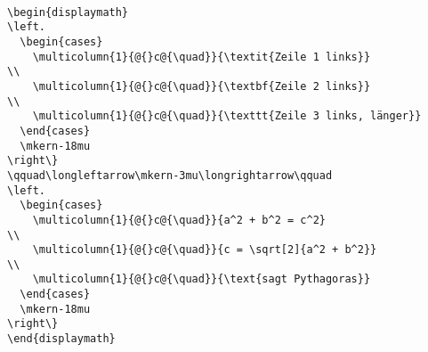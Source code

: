 
\begin{verbatim}

\begin{displaymath}
\left.
  \begin{cases}
    \multicolumn{1}{@{}c@{\quad}}{\textit{Zeile 1 links}}            \\    
    \multicolumn{1}{@{}c@{\quad}}{\textbf{Zeile 2 links}}            \\
    \multicolumn{1}{@{}c@{\quad}}{\texttt{Zeile 3 links, länger}}    
  \end{cases}
  \mkern-18mu
\right\}
\qquad\longleftarrow\mkern-3mu\longrightarrow\qquad
\left.
  \begin{cases}
    \multicolumn{1}{@{}c@{\quad}}{a^2 + b^2 = c^2}                   \\
    \multicolumn{1}{@{}c@{\quad}}{c = \sqrt[2]{a^2 + b^2}}           \\
    \multicolumn{1}{@{}c@{\quad}}{\text{sagt Pythagoras}}            
  \end{cases}
  \mkern-18mu 
\right\}
\end{displaymath}


\end{verbatim}
